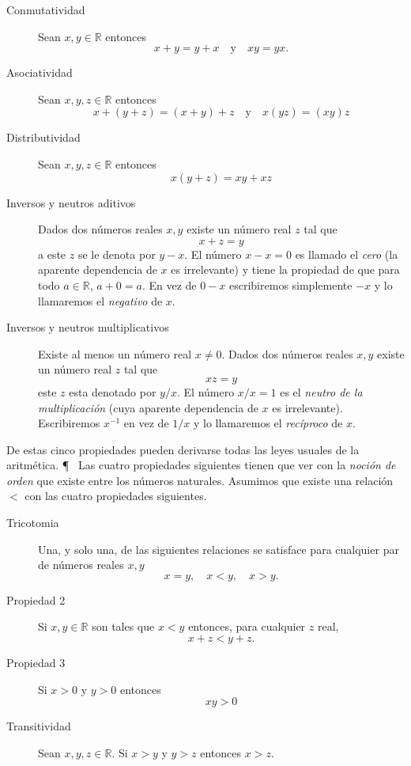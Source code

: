 \begin{description}
	\item[Conmutatividad]%

Sean $x,y\in \mathbb{R}$ entonces
\[
	x+y=y+x\quad\text{y}\quad xy=yx.
\]

\item[Asociatividad]

Sean $x,y,z\in \mathbb{R}$ entonces
\[
	x+(y+z)=(x+y)+z\quad\text{y}\quad x(yz)=(xy)z
\]

\item[Distributividad]%

Sean $x,y,z\in \mathbb{R}$ entonces
\[
	x(y+z) = xy+xz
\]

\item[Inversos y neutros aditivos]%

Dados dos números reales $x,y$  existe un número real $z$ tal que
\[
	x+z=y
\]
a este $z$ se le denota por $y-x$. El número $x-x=0$ es llamado el
\emph{cero} (la aparente dependencia de $x$ es irrelevante) y tiene la
propiedad de que para todo $a\in \mathbb{R}$, $a+0=a$. En vez de
$0-x$ escribiremos simplemente $-x$ y lo llamaremos el \emph{negativo} de $x$.

\item[Inversos y neutros multiplicativos]

Existe al menos un número real $x\neq0$. Dados dos números reales
$x,y$  existe un número real $z$ tal que
\[
	xz=y
\]
este $z$ esta denotado por $y/x$. El número $x/x=1$ es el 
\emph{neutro de la multiplicación} (cuya aparente
dependencia de $x$ es irrelevante). Escribiremos $x ^{-1}$ en 
vez de $1/x$ y lo llamaremos el \emph{recíproco} de $x$.


\end{description}

De estas cinco propiedades pueden derivarse todas las leyes usuales
de la aritmética.
\P~
Las cuatro propiedades siguientes tienen que ver con la
\emph{noción de orden} que existe entre los números naturales.
Asumimos que existe una relación $<$ con las cuatro propiedades
siguientes.

\begin{description}
	\item[Tricotomia]%

Una, y solo una, de las siguientes relaciones se satisface para
cualquier par de números reales $x,y$ 
\[
	x=y,\quad x<y,\quad x>y.
\]

\item[Propiedad 2]%

Si $x,y\in\mathbb{R}$ son tales que $x<y$ entonces, para cualquier
$z$ real,
\[
	x+z<y+z.
\]

\item[Propiedad 3]%

Si $x>0$ y $y>0$ entonces 
\[
	xy>0
\]

\item[Transitividad]%

Sean $x,y,z\in \mathbb{R}$. Si $x>y$ y $y>z$ entonces $x>z$.

\end{description}


